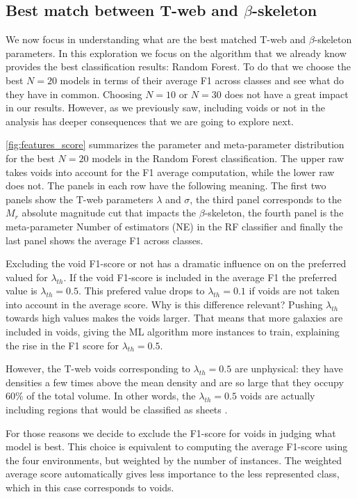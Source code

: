 \documentclass[usenatbib]{mnras}
\begin{document}
\subsection{Best match between T-web and $\beta$-skeleton}

We now focus in understanding what are the best matched T-web and
$\beta$-skeleton parameters.
In this exploration we focus on the algorithm that we already know
provides the best classification results: Random Forest. 
To do that we choose the best $N=20$ models in terms of their average F1 across
classes and see what do they have in common.
Choosing $N=10$ or $N=30$ does not have a great impact in our
results. 
However, as we previously saw, including voids or not in the analysis
has deeper consequences that we are going to explore next.

\ref{fig:features_score} summarizes the parameter and meta-parameter
distribution for the best $N=20$ models in the Random Forest
classification.
The upper raw takes voids into account for the F1 average computation,
while the lower raw does not.
The panels in each row have the following meaning.
The first two panels show the T-web parameters
$\lambda$ and $\sigma$, the third panel corresponds to the $M_r$
absolute magnitude cut that impacts the $\beta$-skeleton, the fourth
panel is the meta-parameter Number of estimators (NE) in the RF
classifier and finally the last panel shows the average F1 across
classes. 

Excluding the void F1-score or not has a dramatic influence on
on the preferred valued for $\lambda_{th}$. 
If the void F1-score is included in the average F1 the preferred value is
$\lambda_{th}=0.5$. 
This prefered value drops to $\lambda_{th}=0.1$ if voids are not taken into
account in the average score.
Why is this difference relevant?
Pushing $\lambda_{th}$ towards high values makes the voids larger.
That means that more galaxies are included in voids, giving the ML
algorithm more instances to train, explaining the rise in the F1 score
for $\lambda_{th}=0.5$.


However, the T-web voids corresponding to $\lambda_{th}=0.5$ are 
unphysical: they have densities a few times above the mean
density and are so large that they occupy $60\%$ of the total volume.
In other words, the $\lambda_{th}=0.5$ voids are actually including
regions that would be classified as sheets
\citep{2015MNRAS.453..497B,Forero-Romero2009}. 


For those reasons we decide to exclude the F1-score for voids in
judging what model is best.
This choice is equivalent to computing the average F1-score using the
four environments, but weighted by the number of instances. 
The weighted average score automatically gives less importance to the
less represented class, which in this case corresponds to voids.
\end{document}
